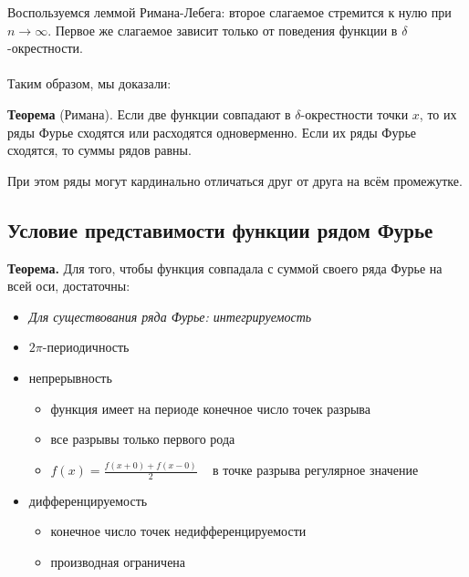 \documentclass[12pt]{article}
\begin{document}
  Воспользуемся леммой Римана-Лебега: второе слагаемое стремится к нулю при $n \rightarrow \infty$. Первое же слагаемое зависит только от поведения функции в $\delta$-окрестности.

  \paragraph{} 

  Таким образом, мы доказали:
  
  \textbf{Теорема} (Римана). Если две функции совпадают в $\delta$-окрестности точки $x$, то их ряды Фурье сходятся или расходятся одноверменно. Если их ряды Фурье сходятся,
  то суммы рядов равны.
  
  При этом ряды могут кардинально отличаться друг от друга на всём промежутке.
  
 \newpage

\subsection{Условие представимости функции рядом Фурье}

 \textbf{Теорема.} Для того, чтобы функция совпадала с суммой своего ряда Фурье на всей оси, достаточны:
  
 \begin{itemize}
     \item \textit{Для существования ряда Фурье: интегрируемость}
     \item $2\pi$-периодичность
     \item непрерывность
         \begin{itemize}
             \item функция имеет на периоде конечное число точек разрыва
             \item все разрывы только первого рода
             \item $f(x) = \frac{f(x + 0) + f(x - 0)}{2}$ ~ в точке разрыва регулярное значение
        \end{itemize}         
    \item дифференцируемость
        \begin{itemize}
            \item конечное число точек недифференцируемости
            \item производная ограничена
         \end{itemize}
\end{itemize}

  \paragraph{}
  
\end{document}
